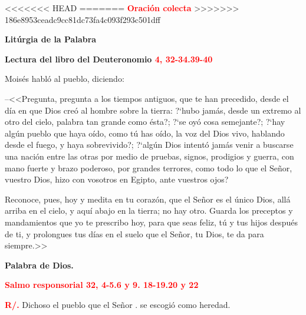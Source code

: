 \documentclass[12pt, letterpaper, spanish]{report}
\begin{document}
<<<<<<< HEAD
\newpage
=======
\huge {\bfseries \textcolor{red}{Oraci\'on colecta}} \newline
>>>>>>> 186e8953ceadc9cc81dc73fa4c093f293c501dff

\begin{center} 
\Huge {\bfseries Lit\'urgia de la Palabra}
\end{center}

\Large {\bfseries Lectura del libro del Deuteronomio \hspace{1cm} \textcolor{red}{4, 32-34.39-40}} \newline

\Large Mois\'es habl\'o al pueblo, diciendo: \newline

--<<Pregunta, pregunta a los tiempos antiguos, que te han precedido, desde el d\'ia en que Dios 
cre\'o al hombre sobre la tierra: ?`hubo jam\'as, desde un extremo al otro del cielo, palabra tan 
grande como \'esta?; ?`se oy\'o cosa semejante?; ?`hay alg\'un pueblo que haya o\'ido, como t\'u has 
o\'ido, la voz del Dios vivo, hablando desde el fuego, y haya sobrevivido?; ?`alg\'un Dios intent\'o 
jam\'as venir a buscarse una naci\'on entre las otras por medio de pruebas, signos, prodigios y 
guerra, con mano fuerte y brazo poderoso, por grandes terrores, como todo lo que el Se\~nor, vuestro 
Dios, hizo con vosotros en Egipto, ante vuestros ojos? \newline

Reconoce, pues, hoy y medita en tu coraz\'on, que el Se\~nor es el \'unico Dios, all\'a arriba en el 
cielo, y aqu\'i abajo en la tierra; no hay otro. Guarda los preceptos y mandamientos que yo te 
prescribo hoy, para que seas feliz, t\'u y tus hijos despu\'es de ti, y prolongues tus d\'ias en el 
suelo que el Se\~nor, tu Dios, te da para siempre.>> \newline

{\bfseries Palabra de Dios.} \newline

\newpage

\Large {\bfseries \textcolor{red}{Salmo responsorial \hspace{1cm} 32, 4-5.6 y 9. 18-19.20 y 22}} \newline

\Large {\bfseries \textcolor{red}{R/.}} \hspace{1cm} Dichoso el pueblo que el Se\~nor \newline
. \hspace{3cm} se escogi\'o como heredad. \newline
\end{document}
